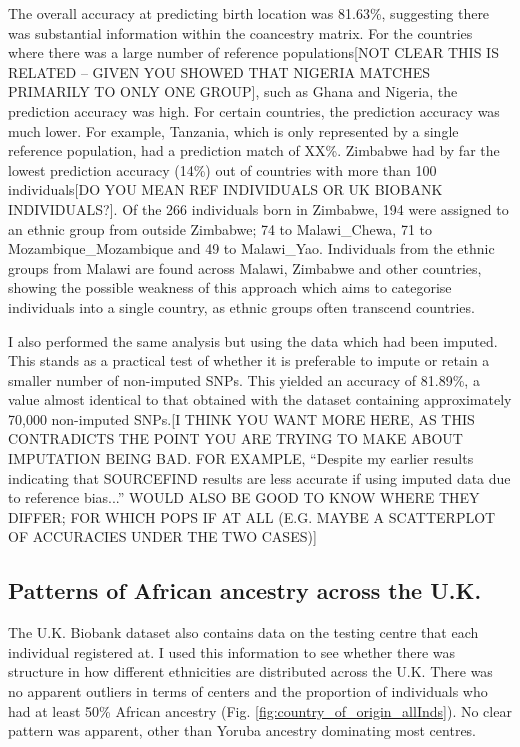 {The overall accuracy at predicting birth location was 81.63\%, suggesting there was substantial information within the coancestry matrix. For the countries where there was {\color{red}a large number of reference populations[NOT CLEAR THIS IS RELATED -- GIVEN YOU SHOWED THAT NIGERIA MATCHES PRIMARILY TO ONLY ONE GROUP]}, such as Ghana and Nigeria, the prediction accuracy was high. For certain countries, the prediction accuracy was much lower. For example, Tanzania, which is only represented by a single reference population, had a prediction match of XX\%. Zimbabwe had by far the lowest prediction accuracy (14\%) out of countries with more than {\color{red}100 individuals[DO YOU MEAN REF INDIVIDUALS OR UK BIOBANK INDIVIDUALS?]}. Of the 266 individuals born in Zimbabwe, 194 were assigned to an ethnic group from outside Zimbabwe; 74 to Malawi\_Chewa, 71 to Mozambique\_Mozambique and 49 to Malawi\_Yao. Individuals from the ethnic groups from Malawi are found across Malawi, Zimbabwe and other countries, showing the possible weakness of this approach which aims to categorise individuals into a single country, as ethnic groups often transcend countries. 

I also performed the same analysis but using the data which had been imputed. This stands as a practical test of whether it is preferable to impute or retain a smaller number of non-imputed SNPs. This yielded an accuracy of 81.89\%, a value almost identical to that obtained with the dataset containing approximately 70,000 non-imputed SNPs.{\color{red}[I THINK YOU WANT MORE HERE, AS THIS CONTRADICTS THE POINT YOU ARE TRYING TO MAKE ABOUT IMPUTATION BEING BAD. FOR EXAMPLE, ``Despite my earlier results indicating that SOURCEFIND results are less accurate if using imputed data due to reference bias...'' WOULD ALSO BE GOOD TO KNOW WHERE THEY DIFFER; FOR WHICH POPS IF AT ALL (E.G. MAYBE A SCATTERPLOT OF ACCURACIES UNDER THE TWO CASES)]}


\subsection{Patterns of African ancestry across the U.K.}

The U.K. Biobank dataset also contains data on the testing centre that each individual registered at. I used this information to see whether there was structure in how different ethnicities are distributed across the U.K. There was no apparent outliers in terms of centers and the proportion of individuals who had at least 50\% African ancestry (Fig. \ref{fig:country_of_origin_allInds}). No clear pattern was apparent, other than Yoruba ancestry dominating most centres. 
 
}

